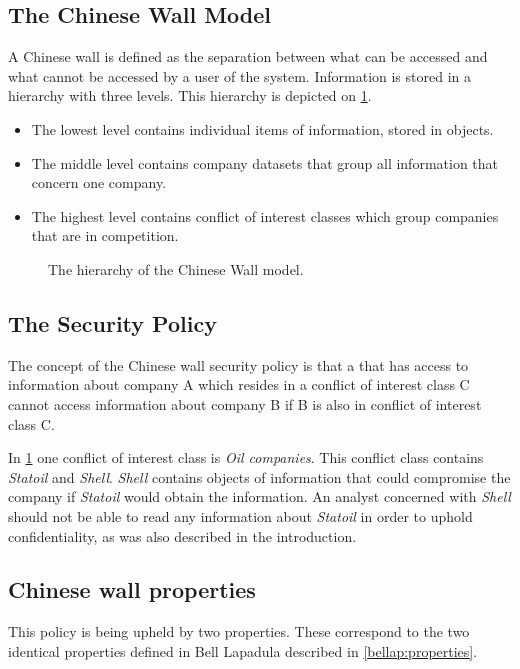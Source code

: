 \subsection*{The Chinese Wall Model}
A Chinese wall is defined as the separation between what can be accessed and what cannot be accessed by a user of the system.
Information is stored in a hierarchy with three levels. 
This hierarchy is depicted on \cref{china:hierarchy}.

\begin{itemize}
	\item The lowest level contains individual items of information, stored in objects.
	\item The middle level contains company datasets that group all information that concern one company. 
	\item The highest level contains conflict of interest classes which group companies that are in competition.
\end{itemize}

\begin{figure}[h]
  \resizebox{\textwidth}{!}{
	}
	\caption{The hierarchy of the Chinese Wall model.}
	\label{china:hierarchy}
\end{figure}

\subsection{The Security Policy}
The concept of the Chinese wall security policy is that a \principal{} that has access to information about company A which resides in a conflict of interest class C cannot access information about company B if B is also in conflict of interest class C.

In \cref{china:hierarchy} one conflict of interest class is \emph{Oil companies}.
This conflict class contains \emph{Statoil} and \emph{Shell}. 
\emph{Shell} contains objects of information that could compromise the company if \emph{Statoil} would obtain the information.
An analyst concerned with \emph{Shell} should not be able to read any information about \emph{Statoil} in order to uphold confidentiality, as was also described in the introduction.

\subsection{Chinese wall properties}
This policy is being upheld by two properties.
These correspond to the two identical properties defined in Bell Lapadula described in \cref{bellap:properties}.

